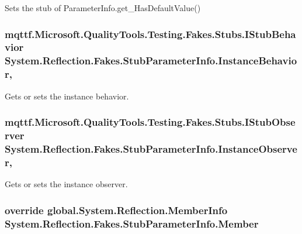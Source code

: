 Sets the stub of Parameter\-Info.\-get\-\_\-\-Has\-Default\-Value()

\hypertarget{class_system_1_1_reflection_1_1_fakes_1_1_stub_parameter_info_a7a6af035811699655c41de670e71f057}{
\subsubsection[{Instance\-Behavior}]{\setlength{\rightskip}{0pt plus 5cm}mqttf.\-Microsoft.\-Quality\-Tools.\-Testing.\-Fakes.\-Stubs.\-I\-Stub\-Behavior System.\-Reflection.\-Fakes.\-Stub\-Parameter\-Info.\-Instance\-Behavior\hspace{0.3cm}{\ttfamily [get]}, {\ttfamily [set]}}}\label{class_system_1_1_reflection_1_1_fakes_1_1_stub_parameter_info_a7a6af035811699655c41de670e71f057}


Gets or sets the instance behavior.

\hypertarget{class_system_1_1_reflection_1_1_fakes_1_1_stub_parameter_info_a500880508f9d1f6aab61d44ce76e23ed}{
\subsubsection[{Instance\-Observer}]{\setlength{\rightskip}{0pt plus 5cm}mqttf.\-Microsoft.\-Quality\-Tools.\-Testing.\-Fakes.\-Stubs.\-I\-Stub\-Observer System.\-Reflection.\-Fakes.\-Stub\-Parameter\-Info.\-Instance\-Observer\hspace{0.3cm}{\ttfamily [get]}, {\ttfamily [set]}}}\label{class_system_1_1_reflection_1_1_fakes_1_1_stub_parameter_info_a500880508f9d1f6aab61d44ce76e23ed}


Gets or sets the instance observer.

\hypertarget{class_system_1_1_reflection_1_1_fakes_1_1_stub_parameter_info_ae75f5297af843763aa7905bfff16ec82}{
\subsubsection[{Member}]{\setlength{\rightskip}{0pt plus 5cm}override global.\-System.\-Reflection.\-Member\-Info System.\-Reflection.\-Fakes.\-Stub\-Parameter\-Info.\-Member\hspace{0.3cm}{\ttfamily [get]}}}\label{class_system_1_1_reflection_1_1_fakes_1_1_stub_parameter_info_ae75f5297af843763aa7905bfff16ec82}


